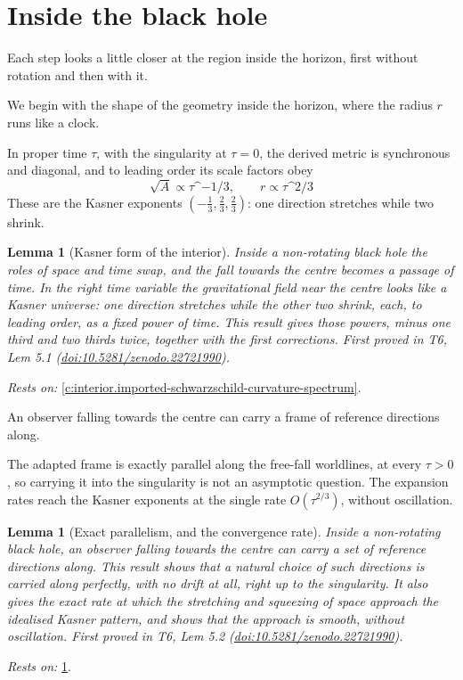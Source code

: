 \documentclass[11pt]{article}
\newtheorem{lemma}[theorem]{Lemma}
\theoremstyle{definition}
\theoremstyle{plain}
\begin{document}
\section{Inside the black hole}

Each step looks a little closer at the region inside the horizon, first without rotation and then with it.

We begin with the shape of the geometry inside the horizon, where the radius $r$ runs like a clock.

In proper time $\tau$, with the singularity at $\tau = 0$, the derived metric is synchronous and diagonal, and to leading order its scale factors obey \[ \sqrt{A} \propto \tau\^{}{-1/3}, \qquad r \propto \tau\^{}{2/3} \] These are the Kasner exponents $(-\tfrac13, \tfrac23, \tfrac23)$: one direction stretches while two shrink.

\begin{lemma}[Kasner form of the interior]\label{c:interior.kasner-form-interior}
Inside a non-rotating black hole the roles of space and time swap, and the fall towards the centre becomes a passage of time. In the right time variable the gravitational field near the centre looks like a Kasner universe: one direction stretches while the other two shrink, each, to leading order, as a fixed power of time. This result gives those powers, minus one third and two thirds twice, together with the first corrections.
\emph{First proved in} T6, Lem 5.1 (\href{https://doi.org/10.5281/zenodo.22721990}{doi:10.5281/zenodo.22721990}).
\end{lemma}
\noindent\emph{Rests on:} \ref{c:interior.imported-schwarzschild-curvature-spectrum}.

An observer falling towards the centre can carry a frame of reference directions along.

The adapted frame is exactly parallel along the free-fall worldlines, at every $\tau > 0$, so carrying it into the singularity is not an asymptotic question. The expansion rates reach the Kasner exponents at the single rate $O(\tau^{2/3})$, without oscillation.

\begin{lemma}[Exact parallelism, and the convergence rate]\label{c:interior.exact-parallelism-convergence-rate}
Inside a non-rotating black hole, an observer falling towards the centre can carry a set of reference directions along. This result shows that a natural choice of such directions is carried along perfectly, with no drift at all, right up to the singularity. It also gives the exact rate at which the stretching and squeezing of space approach the idealised Kasner pattern, and shows that the approach is smooth, without oscillation.
\emph{First proved in} T6, Lem 5.2 (\href{https://doi.org/10.5281/zenodo.22721990}{doi:10.5281/zenodo.22721990}).
\end{lemma}
\noindent\emph{Rests on:} \ref{c:interior.kasner-form-interior}.
\end{document}
